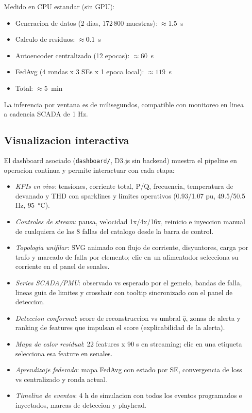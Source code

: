 Medido en CPU estandar (sin GPU):

\begin{itemize}[leftmargin=*,itemsep=2pt]
  \item Generacion de datos (2 dias, 172\,800 muestras): $\approx 1.5$~s
  \item Calculo de residuos: $\approx 0.1$~s
  \item Autoencoder centralizado (12 epocas): $\approx 60$~s
  \item FedAvg (4 rondas x 3 SEs x 1 epoca local): $\approx 119$~s
  \item Total: $\approx 5$~min
\end{itemize}

La inferencia por ventana es de milisegundos, compatible con
monitoreo en linea a cadencia SCADA de 1 Hz.

\subsection{Visualizacion interactiva}

El dashboard asociado (\texttt{dashboard/}, D3.js sin backend)
muestra el pipeline en operacion continua y permite interactuar
con cada etapa:

\begin{itemize}[leftmargin=*,itemsep=2pt]
  \item \emph{KPIs en vivo}: tensiones, corriente total, P/Q,
        frecuencia, temperatura de devanado y THD con sparklines y
        limites operativos (0.93/1.07 pu, 49.5/50.5 Hz, 95~°C).
  \item \emph{Controles de stream}: pausa, velocidad 1x/4x/16x,
        reinicio e inyeccion manual de cualquiera de las 8 fallas
        del catalogo desde la barra de control.
  \item \emph{Topologia unifilar}: SVG animado con flujo de
        corriente, disyuntores, carga por trafo y marcado de
        falla por elemento; clic en un alimentador selecciona su
        corriente en el panel de senales.
  \item \emph{Series SCADA/PMU}: observado vs esperado por el
        gemelo, bandas de falla, lineas guia de limites y
        crosshair con tooltip sincronizado con el panel de
        deteccion.
  \item \emph{Deteccion conformal}: score de reconstruccion vs
        umbral $\hat{q}$, zonas de alerta y ranking de features
        que impulsan el score (explicabilidad de la alerta).
  \item \emph{Mapa de calor residual}: 22 features x 90 s en
        streaming; clic en una etiqueta selecciona esa feature en
        senales.
  \item \emph{Aprendizaje federado}: mapa FedAvg con estado por
        SE, convergencia de loss vs centralizado y ronda actual.
  \item \emph{Timeline de eventos}: 4 h de simulacion con todos
        los eventos programados e inyectados, marcas de
        deteccion y playhead.
\end{itemize}

